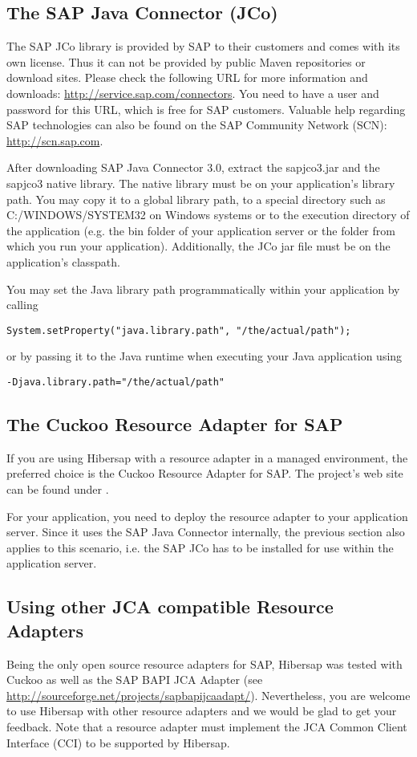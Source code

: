 \subsection{The SAP Java Connector (JCo)}
The SAP JCo library is provided by SAP to their customers and comes with its own license. Thus it can not be provided by public Maven repositories or download sites. Please check the following URL for more information and downloads: \url{http://service.sap.com/connectors}. You need to have a user and password for this URL, which is free for SAP customers. Valuable help regarding SAP technologies can also be found on the SAP Community Network (SCN): \url{http://scn.sap.com}. 

After downloading SAP Java Connector 3.0, extract the sapjco3.jar and the sapjco3 native library. The native library must be on your application's library path. You may copy it to a global library path, to a special directory such as C:/WINDOWS/SYSTEM32 on Windows systems or to the execution directory of the application (e.g. the bin folder of your application server or the folder from which you run your application). Additionally, the JCo jar file must be on the application's classpath. 

You may set the Java library path programmatically within your application by calling 
\begin{lstlisting}
System.setProperty("java.library.path", "/the/actual/path"); 
\end{lstlisting}
or by passing it to the Java runtime when executing your Java application using 
\begin{lstlisting}
-Djava.library.path="/the/actual/path" 
\end{lstlisting}

\subsection{The Cuckoo Resource Adapter for SAP}
If you are using Hibersap with a resource adapter in a managed environment, the preferred choice is the Cuckoo Resource Adapter for SAP. The project's web site can be found under \urlCuckooSite.

For your application, you need to deploy the resource adapter to your application server. Since it uses the SAP Java Connector internally, the previous section also applies to this scenario, i.e. the SAP JCo has to be installed for use within the application server.

\subsection{Using other JCA compatible Resource Adapters}
Being the only open source resource adapters for SAP, Hibersap was tested with Cuckoo as well as the SAP BAPI JCA Adapter (see \url{http://sourceforge.net/projects/sapbapijcaadapt/}). Nevertheless, you are welcome to use Hibersap with other resource adapters and we would be glad to get your feedback. Note that a resource adapter must implement the JCA Common Client Interface (CCI) to be supported by Hibersap.

